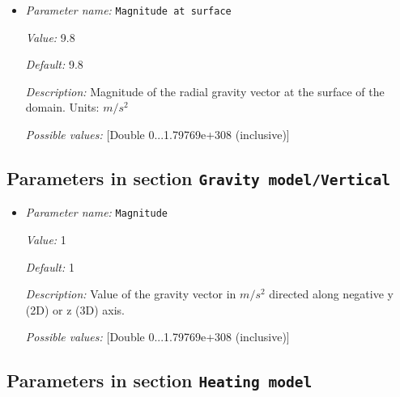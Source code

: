 \begin{itemize}
\item {\it Parameter name:} {\tt Magnitude at surface}
\label{parameters:Gravity model/Radial linear/Magnitude at surface}


{\it Value:} 9.8


{\it Default:} 9.8


{\it Description:} Magnitude of the radial gravity vector at the surface of the domain. Units: $m/s^2$


{\it Possible values:} [Double 0...1.79769e+308 (inclusive)]
\end{itemize}

\subsection{Parameters in section \tt Gravity model/Vertical}
\label{parameters:Gravity_20model/Vertical}

\begin{itemize}
\item {\it Parameter name:} {\tt Magnitude}
\label{parameters:Gravity model/Vertical/Magnitude}


{\it Value:} 1


{\it Default:} 1


{\it Description:} Value of the gravity vector in $m/s^2$ directed along negative y (2D) or z (3D) axis.


{\it Possible values:} [Double 0...1.79769e+308 (inclusive)]
\end{itemize}

\subsection{Parameters in section \tt Heating model}
\label{parameters:Heating_20model}

